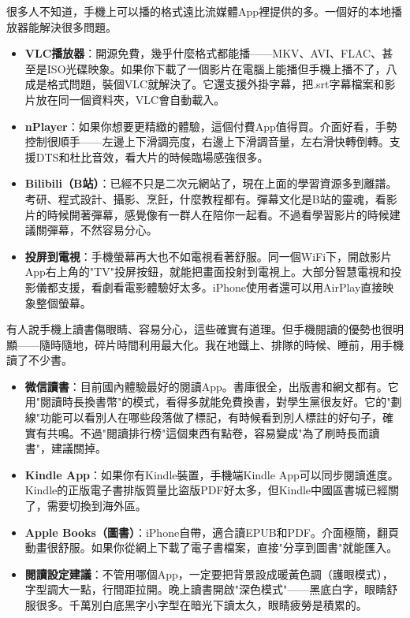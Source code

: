 
很多人不知道，手機上可以播的格式遠比流媒體App裡提供的多。一個好的本地播放器能解決很多問題。

\begin{itemize}
  \item \textbf{VLC播放器}：開源免費，幾乎什麼格式都能播——MKV、AVI、FLAC、甚至是ISO光碟映象。如果你下載了一個影片在電腦上能播但手機上播不了，八成是格式問題，裝個VLC就解決了。它還支援外掛字幕，把.srt字幕檔案和影片放在同一個資料夾，VLC會自動載入。
  \item \textbf{nPlayer}：如果你想要更精緻的體驗，這個付費App值得買。介面好看，手勢控制很順手——左邊上下滑調亮度，右邊上下滑調音量，左右滑快轉倒轉。支援DTS和杜比音效，看大片的時候臨場感強很多。
  \item \textbf{Bilibili（B站）}：已經不只是二次元網站了，現在上面的學習資源多到離譜。考研、程式設計、攝影、烹飪，什麼教程都有。彈幕文化是B站的靈魂，看影片的時候開著彈幕，感覺像有一群人在陪你一起看。不過看學習影片的時候建議關彈幕，不然容易分心。
  \item \textbf{投屏到電視}：手機螢幕再大也不如電視看著舒服。同一個WiFi下，開啟影片App右上角的"TV"投屏按鈕，就能把畫面投射到電視上。大部分智慧電視和投影儀都支援，看劇看電影體驗好太多。iPhone使用者還可以用AirPlay直接映象整個螢幕。
\end{itemize}


有人說手機上讀書傷眼睛、容易分心，這些確實有道理。但手機閱讀的優勢也很明顯——隨時隨地，碎片時間利用最大化。我在地鐵上、排隊的時候、睡前，用手機讀了不少書。

\begin{itemize}
  \item \textbf{微信讀書}：目前國內體驗最好的閱讀App。書庫很全，出版書和網文都有。它用"閱讀時長換書幣"的模式，看得多就能免費換書，對學生黨很友好。它的"劃線"功能可以看別人在哪些段落做了標記，有時候看到別人標註的好句子，確實有共鳴。不過"閱讀排行榜"這個東西有點卷，容易變成"為了刷時長而讀書"，建議關掉。
  \item \textbf{Kindle App}：如果你有Kindle裝置，手機端Kindle App可以同步閱讀進度。Kindle的正版電子書排版質量比盜版PDF好太多，但Kindle中國區書城已經關了，需要切換到海外區。
  \item \textbf{Apple Books（圖書）}：iPhone自帶，適合讀EPUB和PDF。介面極簡，翻頁動畫很舒服。如果你從網上下載了電子書檔案，直接"分享到圖書"就能匯入。
  \item \textbf{閱讀設定建議}：不管用哪個App，一定要把背景設成暖黃色調（護眼模式），字型調大一點，行間距拉開。晚上讀書開啟"深色模式"——黑底白字，眼睛舒服很多。千萬別白底黑字小字型在暗光下讀太久，眼睛疲勞是積累的。
\end{itemize}

